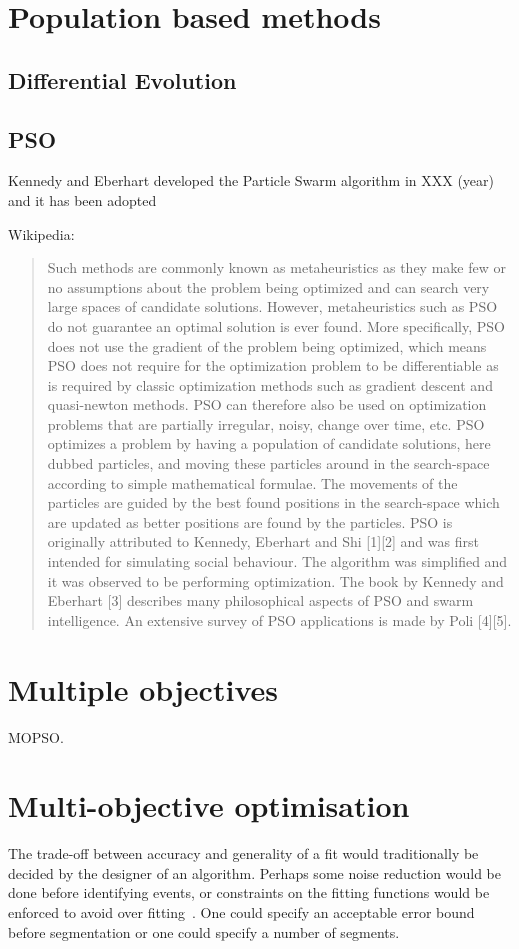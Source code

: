 \section{Population based methods}
\subsection{Differential Evolution}
\subsection{PSO}
Kennedy and Eberhart developed the Particle Swarm algorithm in XXX (year) and it has been adopted

Wikipedia:
\begin{quote}
  Such methods are commonly known as metaheuristics as they make few or no assumptions about the problem being optimized and can search very large spaces of candidate solutions.
  However, metaheuristics such as PSO do not guarantee an optimal solution is ever found.
  More specifically, PSO does not use the gradient of the problem being optimized, which means PSO does not require for the optimization problem to be differentiable as is required by classic optimization methods such as gradient descent and quasi-newton methods.
  PSO can therefore also be used on optimization problems that are partially irregular, noisy, change over time, etc.
  PSO optimizes a problem by having a population of candidate solutions, here dubbed particles, and moving these particles around in the search-space according to simple mathematical formulae.
  The movements of the particles are guided by the best found positions in the search-space which are updated as better positions are found by the particles.
 PSO is originally attributed to Kennedy, Eberhart and Shi [1][2] and was first intended for simulating social behaviour.
  The algorithm was simplified and it was observed to be performing optimization.
  The book by Kennedy and Eberhart [3] describes many philosophical aspects of PSO and swarm intelligence.
  An extensive survey of PSO applications is made by Poli [4][5].
\end{quote}

\section{Multiple objectives}
MOPSO.

\section{Multi-objective optimisation}
\label{sec:multi-object-optim}
The trade-off between accuracy and generality of a fit would traditionally be decided by the designer of an algorithm.
Perhaps some noise reduction would be done before identifying events, or constraints on the fitting functions would be enforced to avoid over fitting~\citep{arora.khot2003fitting,punskaya.andrieu.ea2002bayesian}.
One could specify an acceptable error bound before segmentation or one could specify a number of segments.

